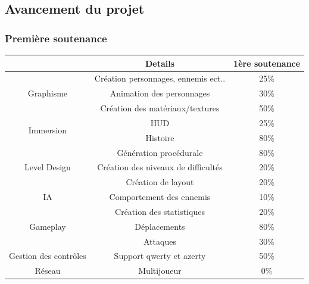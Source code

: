 \documentclass[12pt,a4paper]{article}
\begin{document}
\subsection{\textbf {Avancement du projet}}
\vspace*{.2cm}
\normalsize{\subsubsection{Première soutenance}}
\vspace*{1cm}
\begin{tabular}{|c|c|c|}
\hline
                              & Details                              & 1ère soutenance \\ \hline
\multirow{3}{*}{Graphisme}    & Création  personnages, ennemis ect.. & 25\%            \\ \cline{2-3} 
                              & Animation des personnages            & 30\%            \\ \cline{2-3} 
                              & Création des matériaux/textures      & 50\%            \\ \hline
\multirow{2}{*}{Immersion}    & HUD                                  & 25\%            \\ \cline{2-3} 
                              & Histoire                             & 80\%            \\ \hline
\multirow{3}{*}{Level Design} & Génération procédurale               & 80\%            \\ \cline{2-3} 
                              & Création des niveaux de difficultés  & 20\%            \\ \cline{2-3} 
                              & Création de layout                   & 20\%            \\ \hline
IA                            & Comportement des ennemis             & 10\%            \\ \hline
\multirow{3}{*}{Gameplay}     & Création des statistiques            & 20\%            \\ \cline{2-3} 
                              & Déplacements                         & 80\%            \\ \cline{2-3} 
                              & Attaques                             & 30\%            \\ \hline
Gestion des contrôles         & Support qwerty et azerty             & 50\%            \\ \hline
Réseau                        & Multijoueur                          & 0\%             \\ \hline
\end{tabular}
\\
\vspace*{\fill}
\end{document}
